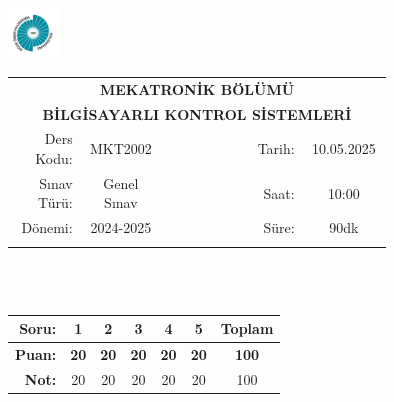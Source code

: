 \newcommand\UniversiteAdi{Niğde Ömer Halisdemir Üniversitesi}
\newcommand\BolumAdi{MEKATRONİK BÖLÜMÜ}
\newcommand\DersKodu{MKT2002}
\newcommand\DersAdi{BİLGİSAYARLI KONTROL SİSTEMLERİ}
\newcommand\SinavAdi{Genel Sınav}
\newcommand\SinavTarihi{10.05.2025}
\newcommand\SinavSaati{10:00}
\newcommand\SinavSuresi{90dk}

\pagestyle{fancy}
\fancyhf{} %
\noindent \includegraphics[width=0.1\textwidth]{logo}
\begin{tabular}{
		p{0.15\linewidth}
		p{0.15\linewidth}
		p{0.2\linewidth}
		p{0.1\linewidth}
		p{0.15\linewidth}}
	\multicolumn{5}{c}{\textbf{\BolumAdi}}        \\
	\multicolumn{5}{c}{\textbf{\DersAdi}}         \\\hline
	\multicolumn{1}{|r|}{Ders Kodu:}  &
	\multicolumn{1}{|c|}{\DersKodu}   &
	\multicolumn{1}{|c|}{}            &
	\multicolumn{1}{|r|}{Tarih:}      &
	\multicolumn{1}{|c|}{\SinavTarihi}            \\\hline
	\multicolumn{1}{|r|}{Sınav Türü:} &
	\multicolumn{1}{|c|}{\SinavAdi}   &
	\multicolumn{1}{|c|}{}            &
	\multicolumn{1}{|r|}{Saat:}       &
	\multicolumn{1}{|c|}{\SinavSaati}             \\\hline
	\multicolumn{1}{|r|}{Dönemi:}     &
	\multicolumn{1}{|c|}{2024-2025}   &
	\multicolumn{1}{|c|}{}            &
	\multicolumn{1}{|r|}{Süre:}       &
	\multicolumn{1}{|c|}{\SinavSuresi}            \\\hline
	                                  &   &  &  & \\
\end{tabular}\\\\
\noindent\begin{center}
	\begin{tabular}{|r|c|c|c|c|c|c|}\hline
		\textbf{Soru:} &
		\textbf{1}     &
		\textbf{2}     &
		\textbf{3}     &
		\textbf{4}     &
		\textbf{5}     &
		\textbf{Toplam}                  \\\hline
		\textbf{Puan:} &
		\textbf{20}    &
		\textbf{20}    &
		\textbf{20}    &
		\textbf{20}    &
		\textbf{20}    &
		\textbf{100}                     \\\hline
		\textbf{Not:}  & 20&20&20&20&  20& 100\\\hline
	\end{tabular}\end{center}
